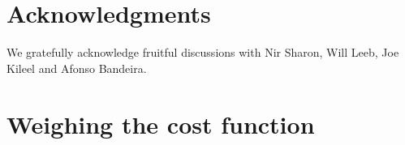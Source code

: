 \documentclass[english]{article}
\numberwithin{equation}{section}
\numberwithin{figure}{section}
\theoremstyle{plain}
\theoremstyle{definition}
\theoremstyle{remark}
\theoremstyle{plain}
\theoremstyle{remark}
\theoremstyle{plain}
\theoremstyle{plain}
\begin{document}
\section*{Acknowledgments}

We gratefully acknowledge fruitful discussions with Nir Sharon, Will Leeb, Joe Kileel and Afonso Bandeira.









\clearpage

\appendix

\section{Weighing the cost function}\label{apdx:weights}
\end{document}
